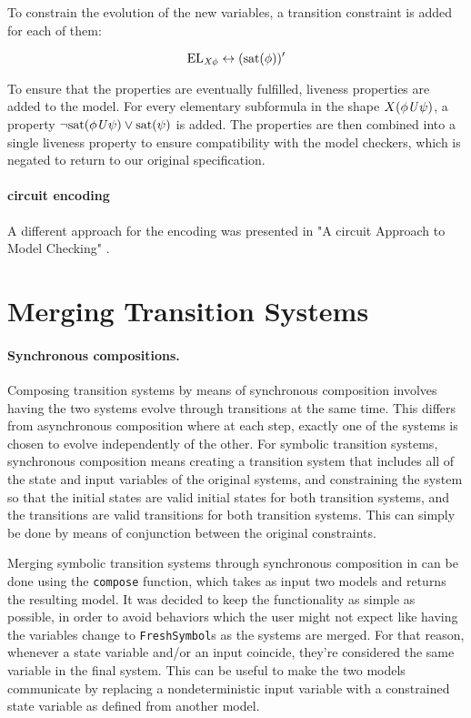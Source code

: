To constrain the evolution of the new variables, a transition constraint is added for each of them:

\[ \mathrm{EL}_{\mathit{X}{} \phi} \leftrightarrow (\mathrm{sat}(\phi))' \]

To ensure that the properties are eventually fulfilled, liveness properties are added to the model.
For every elementary subformula in the shape \begin{math}X (\phi \mathit{U}{} \psi)\end{math}, a property \begin{math}\lnot \mathrm{sat}(\phi \mathit{U}{} \psi) \lor \mathrm{sat}(\psi) \end{math} is added.
The properties are then combined into a single liveness property to ensure compatibility with the model checkers, which is negated to return to our original \ltl{} specification.


\paragraph*{\ltl{} circuit encoding}

A different approach for the encoding was presented in "A circuit Approach to \ltl{} Model Checking" \cite{LTLCircuits}.

\section{Merging Transition Systems}
\paragraph*{Synchronous compositions.}
Composing transition systems by means of synchronous composition involves having the two systems evolve through transitions at the same time.
This differs from asynchronous composition where at each step, exactly one of the systems is chosen to evolve independently of the other.
For symbolic transition systems, synchronous composition means creating a transition system that includes all of the state and input variables of the original systems, and constraining the system so that the initial states are valid initial states for both transition systems, and the transitions are valid transitions for both transition systems.
This can simply be done by means of conjunction between the original constraints.

Merging symbolic transition systems through synchronous composition in \pyvmt{} can be done using the \texttt{compose} function, which takes as input two models and returns the resulting model.
It was decided to keep the functionality as simple as possible, in order to avoid behaviors which the user might not expect like having the variables change to \texttt{FreshSymbol}s as the systems are merged.
For that reason, whenever a state variable and/or an input coincide, they're considered the same variable in the final system.
This can be useful to make the two models communicate by replacing a nondeterministic input variable with a constrained state variable as defined from another model.

